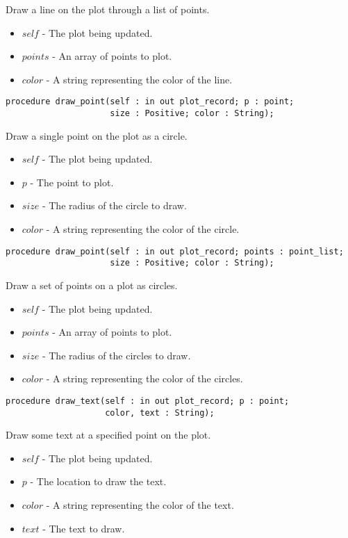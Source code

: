 \documentclass[10pt, openany]{book}
\begin{document}
Draw a line on the plot through a list of points.
\begin{itemize}
  \item $self$ - The plot being updated.
  \item $points$ - An array of points to plot.
  \item $color$ - A string representing the color of the line.
\end{itemize}
\begin{lstlisting}
procedure draw_point(self : in out plot_record; p : point;
                     size : Positive; color : String);
\end{lstlisting}
Draw a single point on the plot as a circle.
\begin{itemize}
  \item $self$ - The plot being updated.
  \item $p$ - The point to plot.
  \item $size$ - The radius of the circle to draw.
  \item $color$ - A string representing the color of the circle.
\end{itemize}
\begin{lstlisting}
procedure draw_point(self : in out plot_record; points : point_list;
                     size : Positive; color : String);
\end{lstlisting}
Draw a set of points on a plot as circles.
\begin{itemize}
  \item $self$ - The plot being updated.
  \item $points$ - An array of points to plot.
  \item $size$ - The radius of the circles to draw.
  \item $color$ - A string representing the color of the circles.
\end{itemize}
\begin{lstlisting}
procedure draw_text(self : in out plot_record; p : point;
                    color, text : String);
\end{lstlisting}
Draw some text at a specified point on the plot.
\begin{itemize}
  \item $self$ - The plot being updated.
  \item $p$ - The location to draw the text.
  \item $color$ - A string representing the color of the text.
  \item $text$ - The text to draw.
\end{itemize}
\end{document}
